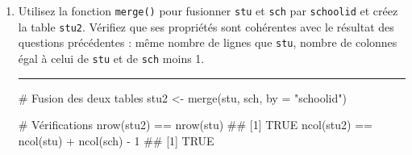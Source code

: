 \documentclass[12pt,twosided, notitlepage]{book}
\newenvironment{Shaded}{}{}
\newcommand{\KeywordTok}[1]{\textcolor[rgb]{0.00,0.00,1.00}{{#1}}}
\newcommand{\DataTypeTok}[1]{{#1}}
\newcommand{\DecValTok}[1]{{#1}}
\newcommand{\StringTok}[1]{\textcolor[rgb]{0.00,0.50,0.50}{{#1}}}
\newcommand{\CommentTok}[1]{\textcolor[rgb]{0.00,0.50,0.00}{{#1}}}
\newcommand{\NormalTok}[1]{{#1}}
\newif \ifsol
\renewenvironment{Shaded}{\begin{snugshade}}{\end{snugshade}}
\begin{document}
\begin{enumerate}
\begin{enumerate}
    \ifsol 

    \begin{center} \rule{0.5\linewidth}{\linethickness}\end{center}

\begin{Shaded}
\begin{Highlighting}[]
\CommentTok{# Pour vérifier que schoolid identifie sch il suffit}
\CommentTok{# de comparer le nombre de valeurs distinctes au}
\CommentTok{# nombre de lignes}
\KeywordTok{length}\NormalTok{(}\KeywordTok{unique}\NormalTok{(sch$schoolid))}
  \NormalTok{## [1] 226}
\KeywordTok{nrow}\NormalTok{(sch)}
  \NormalTok{## [1] 226}
\CommentTok{# Tout va bien !    }
\end{Highlighting}
\end{Shaded}

    \begin{center} \rule{0.5\linewidth}{\linethickness}\end{center}

    \bigskip  \fi 
  \item
    Utilisez la fonction \texttt{merge()} pour
    fusionner \texttt{stu} et \texttt{sch} par \texttt{schoolid} et
    créez la table \texttt{stu2}. Vérifiez que ses propriétés sont
    cohérentes avec le résultat des questions précédentes : même nombre
    de lignes que \texttt{stu}, nombre de colonnes égal à celui de
    \texttt{stu} et de \texttt{sch} moins 1.

    \ifsol 

    \begin{center} \rule{0.5\linewidth}{\linethickness}\end{center}

\begin{Shaded}
\begin{Highlighting}[]
\CommentTok{# Fusion des deux tables}
\NormalTok{stu2 <-}\StringTok{ }\KeywordTok{merge}\NormalTok{(stu, sch, }\DataTypeTok{by =} \StringTok{"schoolid"}\NormalTok{)}

\CommentTok{# Vérifications }
\KeywordTok{nrow}\NormalTok{(stu2) ==}\StringTok{ }\KeywordTok{nrow}\NormalTok{(stu)}
  \NormalTok{## [1] TRUE}
\KeywordTok{ncol}\NormalTok{(stu2) ==}\StringTok{ }\KeywordTok{ncol}\NormalTok{(stu) +}\StringTok{ }\KeywordTok{ncol}\NormalTok{(sch) -}\StringTok{ }\DecValTok{1}
  \NormalTok{## [1] TRUE}
\end{Highlighting}
\end{Shaded}


\end{enumerate}
\end{enumerate}
\end{document}
